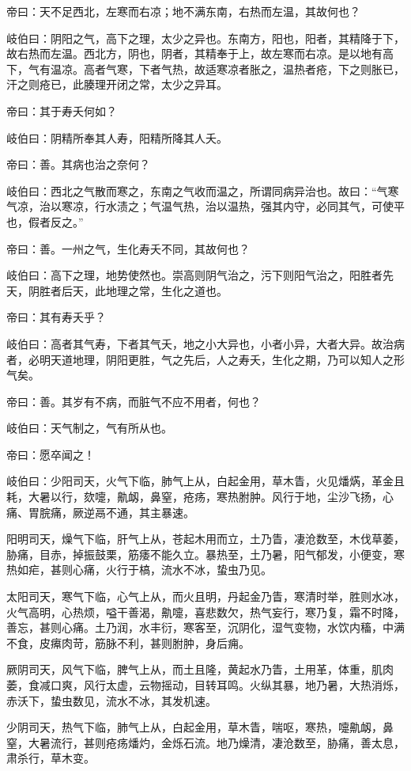 \documentclass{article}%
\begin{document}
帝曰：天不足西北，左寒而右凉；地不满东南，右热而左温，其故何也？

岐伯曰：阴阳之气，高下之理，太少之异也。东南方，阳也，阳者，其精降于下，故右热而左温。西北方，阴也，阴者，其精奉于上，故左寒而右凉。是以地有高下，气有温凉。高者气寒，下者气热，故适寒凉者胀之，温热者疮，下之则胀已，汗之则疮已，此腠理开闭之常，太少之异耳。

帝曰：其于寿夭何如？

岐伯曰：阴精所奉其人寿，阳精所降其人夭。

帝曰：善。其病也治之奈何？

岐伯曰：西北之气散而寒之，东南之气收而温之，所谓同病异治也。故曰：“气寒气凉，治以寒凉，行水渍之；气温气热，治以温热，强其内守，必同其气，可使平也，假者反之。”

帝曰：善。一州之气，生化寿夭不同，其故何也？

岐伯曰：高下之理，地势使然也。崇高则阴气治之，污下则阳气治之，阳胜者先天，阴胜者后天，此地理之常，生化之道也。

帝曰：其有寿夭乎？

岐伯曰：高者其气寿，下者其气夭，地之小大异也，小者小异，大者大异。故治病者，必明天道地理，阴阳更胜，气之先后，人之寿夭，生化之期，乃可以知人之形气矣。

帝曰：善。其岁有不病，而脏气不应不用者，何也？

岐伯曰：天气制之，气有所从也。

帝曰：愿卒闻之！

岐伯曰：少阳司天，火气下临，肺气上从，白起金用，草木眚，火见燔焫，革金且耗，大暑以行，欬嚏，鼽衂，鼻窒，疮疡，寒热胕肿。风行于地，尘沙飞扬，心痛、胃脘痛，厥逆鬲不通，其主暴速。

阳明司天，燥气下临，肝气上从，苍起木用而立，土乃眚，凄沧数至，木伐草萎，胁痛，目赤，掉振鼓栗，筋痿不能久立。暴热至，土乃暑，阳气郁发，小便变，寒热如疟，甚则心痛，火行于槁，流水不冰，蛰虫乃见。

太阳司天，寒气下临，心气上从，而火且明，丹起金乃眚，寒清时举，胜则水冰，火气高明，心热烦，嗌干善渴，鼽嚏，喜悲数欠，热气妄行，寒乃复，霜不时降，善忘，甚则心痛。土乃润，水丰衍，寒客至，沉阴化，湿气变物，水饮内稸，中满不食，皮𤸷肉苛，筋脉不利，甚则胕肿，身后痈。

厥阴司天，风气下临，脾气上从，而土且隆，黄起水乃眚，土用革，体重，肌肉萎，食减口爽，风行太虚，云物摇动，目转耳鸣。火纵其暴，地乃暑，大热消烁，赤沃下，蛰虫数见，流水不冰，其发机速。

少阴司天，热气下临，肺气上从，白起金用，草木眚，喘呕，寒热，嚏鼽衂，鼻窒，大暑流行，甚则疮疡燔灼，金烁石流。地乃燥清，凄沧数至，胁痛，善太息，肃杀行，草木变。
\end{document}
